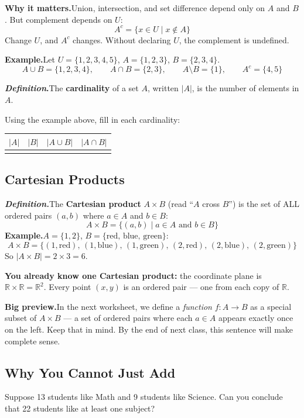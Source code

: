 \documentclass[12pt]{article}
\begin{document}
\medskip
\textbf{Why it matters.}\quad Union, intersection, and set difference
depend only on $A$ and $B$. But complement depends on $U$:
\[
  A^c = \{x \in U \mid x \notin A\}
\]
Change $U$, and $A^c$ changes. Without declaring $U$, the complement is undefined.

\medskip
\textbf{Example.}\quad Let $U = \{1,2,3,4,5\}$, $A = \{1,2,3\}$, $B = \{2,3,4\}$.
\[
  A \cup B = \{1,2,3,4\},\qquad
  A \cap B = \{2,3\},\qquad
  A \setminus B = \{1\},\qquad
  A^c = \{4,5\}
\]

\medskip
\textbf{\textit{Definition}.}\quad The \textbf{cardinality} of a set $A$,
written $|A|$, is the number of elements in $A$.

Using the example above, fill in each cardinality:

\medskip
\renewcommand{\arraystretch}{2.2}
\begin{tabular}{|C{3.5cm}|C{3.5cm}|C{3.5cm}|C{3.5cm}|}
\hline
$|A|$ & $|B|$ & $|A \cup B|$ & $|A \cap B|$ \\
\hline
& & & \\
\hline
\end{tabular}
\renewcommand{\arraystretch}{1}

\bigskip
\subsection*{Cartesian Products}
\textbf{\textit{Definition.}}\quad The \textbf{Cartesian product} $A \times B$ (read ``$A$ cross $B$'') is
the set of ALL ordered pairs $(a,b)$ where $a \in A$ and $b \in B$:
\[
  A \times B = \{(a,b) \mid a \in A \text{ and } b \in B\}
\]
\textbf{Example.}\quad $A = \{1,2\}$, $B = \{\text{red},\, \text{blue},\, \text{green}\}$:
\[
  A \times B = \{(1,\text{red}),\,(1,\text{blue}),\,(1,\text{green}),\,
                 (2,\text{red}),\,(2,\text{blue}),\,(2,\text{green})\}
\]
So $|A \times B| = 2 \times 3 = 6$.

\medskip
\textbf{You already know one Cartesian product:} the coordinate plane is
$\mathbb{R} \times \mathbb{R} = \mathbb{R}^2$.
Every point $(x, y)$ is an ordered pair --- one from each copy of $\mathbb{R}$.

\medskip
\textbf{Big preview.}\quad In the next worksheet, we define a
\textit{function} $f\colon A \to B$ as a special subset of $A \times B$ ---
a set of ordered pairs where each $a \in A$ appears exactly once on the left.
Keep that in mind. By the end of next class, this sentence will make complete sense.

\subsection*{Why You Cannot Just Add}
Suppose 13 students like Math and 9 students like Science.
Can you conclude that 22 students like at least one subject?
\end{document}

